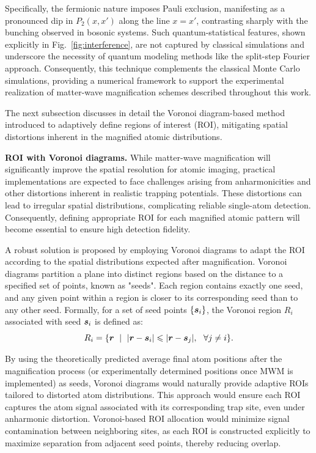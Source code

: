 Specifically, the fermionic nature imposes Pauli exclusion, manifesting as a pronounced dip in $P_2(x,x')$ along the line $x=x'$, contrasting sharply with the bunching observed in bosonic systems. Such quantum-statistical features, shown explicitly in Fig.~\ref{fig:interference}, are not captured by classical simulations and underscore the necessity of quantum modeling methods like the split-step Fourier approach. Consequently, this technique complements the classical Monte Carlo simulations, providing a numerical framework to support the experimental realization of matter-wave magnification schemes described throughout this work.

The next subsection discusses in detail the Voronoi diagram-based method introduced to adaptively define regions of interest (ROI), mitigating spatial distortions inherent in the magnified atomic distributions.


\textbf{ROI with Voronoi diagrams.}
While matter-wave magnification will significantly improve the spatial resolution for atomic imaging, practical implementations are expected to face challenges arising from anharmonicities and other distortions inherent in realistic trapping potentials. These distortions can lead to irregular spatial distributions, complicating reliable single-atom detection. Consequently, defining appropriate ROI for each magnified atomic pattern will become essential to ensure high detection fidelity.

A robust solution is proposed by employing Voronoi diagrams to adapt the ROI according to the spatial distributions expected after magnification. Voronoi diagrams partition a plane into distinct regions based on the distance to a specified set of points, known as "seeds". Each region contains exactly one seed, and any given point within a region is closer to its corresponding seed than to any other seed. Formally, for a set of seed points $\{\boldsymbol{s}_i\}$, the Voronoi region $R_i$ associated with seed $\boldsymbol{s}_i$ is defined as:
\begin{equation}
R_i = \{\vc{r} \ \mid \ |\vc{r}-\vc{s}_i| \leq |\vc{r}-\vc{s}_j|, \ \  \forall j \neq i\}.
\end{equation}

By using the theoretically predicted average final atom positions after the magnification process (or experimentally determined positions once MWM is implemented) as seeds, Voronoi diagrams would naturally provide adaptive ROIs tailored to distorted atom distributions. This approach would ensure each ROI captures the atom signal associated with its corresponding trap site, even under anharmonic distortion. Voronoi-based ROI allocation would minimize signal contamination between neighboring sites, as each ROI is constructed explicitly to maximize separation from adjacent seed points, thereby reducing overlap.


